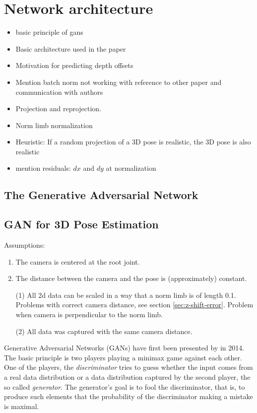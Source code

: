 \section{Network architecture}\label{sec:network}
\begin{itemize}
	\item basic principle of gans
	\item Basic architecture used in the paper
	\item Motivation for predicting depth offsets
	\item Mention batch norm not working with reference to other paper and communication with authors
	\item Projection and reprojection.
	\item Norm limb normalization
	\item Heuristic: If a random projection of a 3D pose is realistic, the 3D pose is also realistic
	\item mention residuals: $dx$ and $dy$ at normalization
\end{itemize}

\subsection{The Generative Adversarial Network}

\subsection{GAN for 3D Pose Estimation}

Assumptions:
\begin{enumerate}[label=(\Alph*)]
	\item The camera is centered at the root joint.
	\item The distance between the camera and the pose is (approximately) constant. 
\end{enumerate}
\begin{itemize}
	\item[(1)] All 2d data can be scaled in a way that a norm limb is of length 0.1. 
	Problems with correct camera distance, see section \ref{sec:z-shift-error}. 
	Problem when camera is perpendicular to the norm limb.
	\item[(2)] All data was captured with the same camera distance.
\end{itemize}

Generative Adversarial Networks (GANs) have first been presented by \citet{goodfellow14} in 2014.
The basic principle is two players playing a minimax game against each other.
One of the players, the \textit{discriminator} tries to guess whether the input comes from a real data distribution or a data distribution captured by the second player, the so called \textit{generator}. 
The generator's goal is to fool the discriminator, that is, to produce such elements that the probability of the discriminator making a mistake is maximal.

